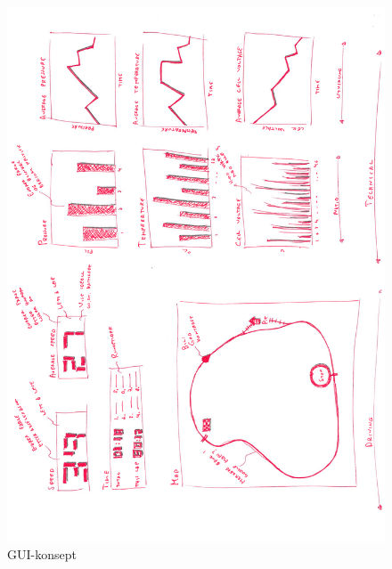 \begin{figure}[H]
\includegraphics[width=\textwidth]{images/gui_concept_hans.pdf}
\caption{GUI-konsept} 
\label{gui-concept}
\end{figure}
